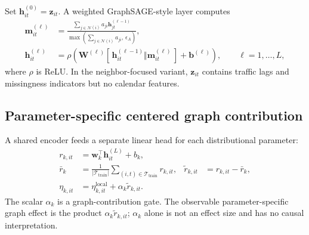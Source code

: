 \documentclass[11pt]{article}
\newcommand{\trainset}{\mathcal{T}_{\mathrm{train}}}
\newcommand{\neighbors}{\mathcal{N}}
\begin{document}
Set $\bm{h}^{(0)}_{it}=\bm{z}_{it}$. A weighted GraphSAGE-style layer computes
\begin{align}
  \bm{m}^{(\ell)}_{it}
    &=
    \frac{\sum_{j\in\neighbors(i)}
      a_{ji}\bm{h}^{(\ell-1)}_{jt}}
    {\max\!\left(\sum_{j\in\neighbors(i)}a_{ji},\,\epsilon_A\right)},
                                                                    \label{eq:aggregation}\\
  \bm{h}^{(\ell)}_{it}
    &= \rho\!\left(
      \bm{W}^{(\ell)}
      [\,\bm{h}^{(\ell-1)}_{it}\Vert\bm{m}^{(\ell)}_{it}\,]
      +\bm{b}^{(\ell)}
    \right), \qquad \ell=1,\ldots,L,                                \label{eq:graphsage}
\end{align}
where $\rho$ is ReLU. In the neighbor-focused variant, $\bm{z}_{it}$ contains
traffic lags and missingness indicators but no calendar features.

\subsection{Parameter-specific centered graph contribution}

A shared encoder feeds a separate linear head for each distributional
parameter:
\begin{align}
  r_{k,it}
    &= \bm{w}_k^\top\bm{h}^{(L)}_{it}+b_k,                            \label{eq:graph-head}\\
  \bar r_k
    &= \frac{1}{|\trainset|}\sum_{(i,t)\in\trainset}r_{k,it},
  &
  \widetilde r_{k,it}
    &= r_{k,it}-\bar r_k,                                            \label{eq:graph-centering}\\
  \eta_{k,it}
    &= \eta^{\mathrm{local}}_{k,it}
       +\alpha_k\widetilde r_{k,it}.                                 \label{eq:graphnamlss}
\end{align}
The scalar $\alpha_k$ is a graph-contribution gate. The observable
parameter-specific graph effect is the product
$\alpha_k\widetilde r_{k,it}$; $\alpha_k$ alone is not an effect size and has
no causal interpretation.
\end{document}
